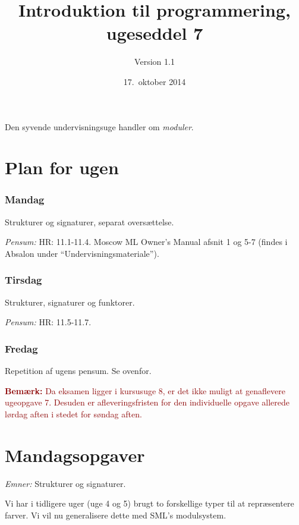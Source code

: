 \documentclass[a4paper,12pt]{article}
\title{Introduktion til programmering, ugeseddel 7}
\author{Version 1.1}%
\date{17.\ oktober 2014}
\begin{document}
\maketitle{} Den syvende undervisningsuge handler om \textit{moduler}.

\section{Plan for ugen}
\label{sec:pensum-og-plan}

\subsubsection*{Mandag}
Strukturer og signaturer, separat oversættelse.

\textit{Pensum:} HR: 11.1-11.4. Moscow ML Owner's Manual afsnit 1 og
5-7 (findes i Absalon under ``Undervisningsmateriale'').

\subsubsection*{Tirsdag}
Strukturer, signaturer og funktorer.

\textit{Pensum:} HR: 11.5-11.7.

\subsubsection*{Fredag}
Repetition af ugens pensum. Se ovenfor.


\vspace{5ex}

\textcolor{darkred}{\textbf{Bemærk:} Da eksamen ligger i kursusuge 8,
  er det ikke muligt at genaflevere ugeopgave 7.  Desuden er
  afleveringsfristen for den individuelle opgave allerede lørdag aften
  i stedet for søndag aften.}

\newpage
\section{Mandagsopgaver}
\label{sec:mandagsopgaver}

\textit{Emner:} Strukturer og signaturer.

\vspace{1ex}

\noindent
Vi har i tidligere uger (uge 4 og 5) brugt to forskellige typer til at
repræsentere farver.  Vi vil nu generalisere dette med SML's
modulsystem.
\end{document}

